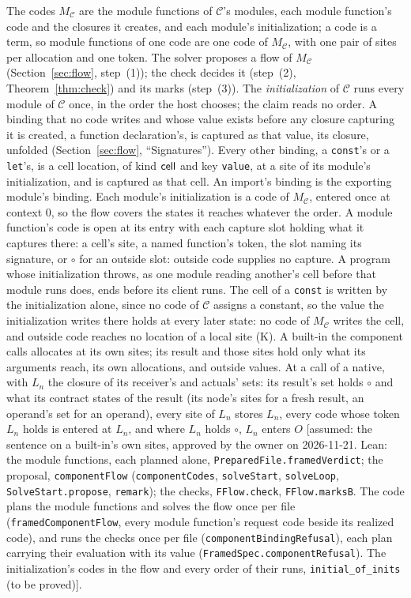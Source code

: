 \documentclass[10pt,a4paper]{article}
\theoremstyle{definition}
\theoremstyle{remark}
\newcommand{\code}[1]{\texttt{#1}}
\newcommand{\lean}[1]{\texttt{\small #1}}
\newcommand{\status}[1]{\textsf{\small[#1]}}
\newcommand{\cC}{\mathcal{C}}
\begin{document}
\begin{description}[leftmargin=1.5em,style=nextline]
\item[(A2) The flow of sites] The codes $M_\cC$ are the module functions
of $\cC$'s modules, each module function's code and the closures it creates, and each
module's initialization; a code is a term, so module functions of one code
are one code of $M_\cC$, with one pair of sites per allocation and one
token. The solver proposes a flow of $M_\cC$
(Section~\ref{sec:flow}, step~(1)); the check decides it (step~(2),
Theorem~\ref{thm:check}) and its marks (step~(3)). The
\emph{initialization} of $\cC$ runs every module of $\cC$ once, in the
order the host chooses; the claim reads no order. A binding that no code
writes and whose value exists before any closure capturing it is
created, a function declaration's, is captured as that value, its
closure, unfolded (Section~\ref{sec:flow}, ``Signatures''). Every other
binding, a \code{const}'s or a \code{let}'s, is a cell location, of kind
$\mathsf{cell}$ and key \code{value}, at a site of its module's initialization, and
is captured as that cell. An import's binding is the exporting module's
binding. Each module's initialization is a code of $M_\cC$, entered once
at context $0$, so the flow covers the states it reaches whatever the
order. A module function's code is open at its entry with each capture
slot holding what it captures there: a cell's site, a named function's
token, the slot naming its signature, or $\circ$ for an outside slot:
outside code supplies no capture. A program whose initialization throws,
as one module reading another's cell before that module runs does, ends
before its client runs.
The cell of a \code{const} is written by the initialization alone, since
no code of $\cC$ assigns a constant, so the value the initialization
writes there holds at every later state: no code of $M_\cC$ writes the
cell, and outside code reaches no location of a local site (K).
A built-in the component calls allocates at its own sites; its result and those sites hold only what its arguments reach, its own allocations, and outside values.
At a call of a native, with $L_n$ the closure of its receiver's and
actuals' sets: its result's set holds $\circ$ and what its contract states
of the result (its node's sites for a fresh result, an operand's set for
an operand), every site of
$L_n$ stores $L_n$, every code whose token $L_n$ holds is entered at
$L_n$, and where $L_n$ holds $\circ$, $L_n$ enters $O$
\status{assumed: the sentence on a built-in's own sites, approved by the owner on 2026-11-21. Lean: the module functions, each planned alone, \lean{PreparedFile.framedVerdict}; the proposal, \lean{componentFlow} (\lean{componentCodes}, \lean{solveStart}, \lean{solveLoop}, \lean{SolveStart.propose}, \lean{remark}); the checks, \lean{FFlow.check}, \lean{FFlow.marksB}. The code plans the module functions and solves the flow once per file (\lean{framedComponentFlow}, every module function's request code beside its realized code), and runs the checks once per file (\lean{componentBindingRefusal}), each plan carrying their evaluation with its value (\lean{FramedSpec.componentRefusal}). The initialization's codes in the flow and every order of their runs, \lean{initial\_of\_inits} (to be proved)}.

\end{description}
\end{document}
